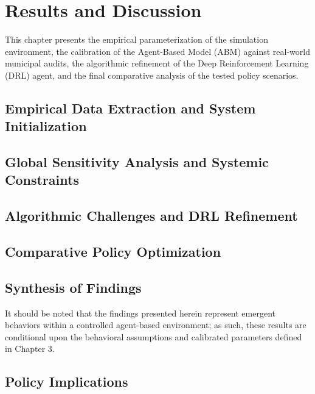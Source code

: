 \chapter{Results and Discussion}
This chapter presents the empirical parameterization of the simulation environment, the calibration of the Agent-Based Model (ABM) against real-world municipal audits, the algorithmic refinement of the Deep Reinforcement Learning (DRL) agent, and the final comparative analysis of the tested policy scenarios.

\section{Empirical Data Extraction and System Initialization}


\section{Global Sensitivity Analysis and Systemic Constraints}


\section{Algorithmic Challenges and DRL Refinement}


\section{Comparative Policy Optimization}


\section{Synthesis of Findings}


It should be noted that the findings presented herein represent emergent behaviors within a controlled agent-based environment; as such, these results are conditional upon the behavioral assumptions and calibrated parameters defined in Chapter 3.

\section{Policy Implications}
